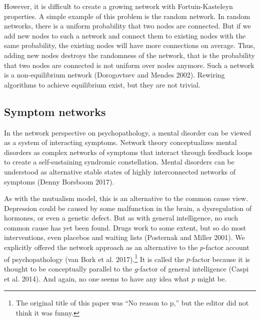 \documentclass[
  a4paper,
  DIV=11,
  numbers=noendperiod]{scrreprt}
\begin{document}
However, it is difficult to create a growing network with
Fortuin-Kasteleyn properties. A simple example of this problem is the
random network. In random networks, there is a uniform probability that
two nodes are connected. But if we add new nodes to such a network and
connect them to existing nodes with the same probability, the existing
nodes will have more connections on average. Thus, adding new nodes
destroys the randomness of the network, that is the probability that two
nodes are connected is not uniform over nodes anymore. Such a network is
a non-equilibrium network (Dorogovtsev and Mendes 2002). Rewiring
algorithms to achieve equilibrium exist, but they are not trivial.

\hypertarget{sec-Symptom-networks}{%
\subsection{Symptom networks}\label{sec-Symptom-networks}}

In the network perspective on psychopathology, a mental disorder can be
viewed as a system of interacting symptoms. Network theory
conceptualizes mental disorders as complex networks of symptoms that
interact through feedback loops to create a self-sustaining syndromic
constellation. Mental disorders can be understood as alternative stable
states of highly interconnected networks of symptoms (Denny Borsboom
2017).

As with the mutualism model, this is an alternative to the common cause
view. Depression could be caused by some malfunction in the brain, a
dysregulation of hormones, or even a genetic defect. But as with general
intelligence, no such common cause has yet been found. Drugs work to
some extent, but so do most interventions, even placebos and waiting
lists (Posternak and Miller 2001). We explicitly offered the network
approach as an alternative to the \(p\)-factor account of
psychopathology (van Bork et al. 2017).\footnote{The original title of
  this paper was ``No reason to p,'' but the editor did not think it was
  funny.} It is called the \(p\)-factor because it is thought to be
conceptually parallel to the \(g\)-factor of general intelligence (Caspi
et al. 2014). And again, no one seems to have any idea what \(p\) might
be.
\end{document}
